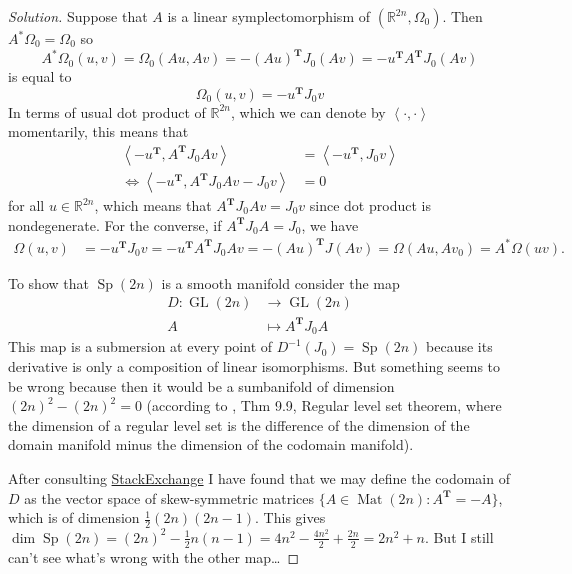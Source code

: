 \begin{proof}[Solution]\leavevmode
	Suppose that $A$ is a linear symplectomorphism of $(\mathbb{R}^{2n},\Omega_0)$. Then $A^{*}\Omega_0=\Omega_0$ so 
	\[A^{*}\Omega_0(u,v) =\Omega_0(Au,Av)=-(Au)^{\mathbf{T}}J_0(Av)=-u^{\mathbf{T}}A^{\mathbf{T}}J_0(Av)\]
is equal to
		\[\Omega_0(u,v)=-u^{\mathbf{T}}J_0v\]
In terms of usual dot product of $\mathbb{R}^{2n}$, which we can denote by $\left<\cdot ,\cdot \right> $ momentarily, this means that
\begin{align*}
	\left<-u^{\mathbf{T}},A^{\mathbf{T}}J_0Av\right> &=\left<-u^{\mathbf{T}},J_0v\right>\\
	\iff\left<-u^{\mathbf{T}},A^{\mathbf{T}}J_0Av-J_0v\right> &=0
\end{align*}
for all $u\in\mathbb{R}^{2n}$, which means that $A^{\mathbf{T}}J_0Av=J_0v$ since dot product is nondegenerate. For the converse, if $A^{\mathbf{T}}J_0A=J_0$, we have
\begin{align*}
	\Omega(u,v)&=-u^{\mathbf{T}}J_0v=-u^{\mathbf{T}}A^{\mathbf{T}}J_0Av=-(Au)^{\mathbf{T}}J(Av)=\Omega(Au,Av_0)=A^*\Omega(uv).
\end{align*}

To show that $\operatorname{Sp}(2n)$ is a smooth manifold consider the map
\begin{align*}
	D: \operatorname{GL}(2n) &\longrightarrow \operatorname{GL}(2n) \\
	A &\longmapsto A^{\mathbf{T}}J_0A
\end{align*}
This map is a submersion at every point of $D^{-1}(J_0)=\operatorname{Sp}(2n)$ because its derivative is only a composition of linear isomorphisms. But something seems to be wrong because then it would be a sumbanifold of dimension $(2n)^2-(2n)^2=0$ (according to \cite{loring}, Thm 9.9, Regular level set theorem, where the dimension of a regular level set is the difference of the dimension of the domain manifold minus the dimension of the codomain manifold).

After consulting \href{https://math.stackexchange.com/questions/4299154/the-symplectic-group-as-a-submanifold-of-mathbbr2n-times-2n}{StackExchange} I have found that we may define the codomain of $D$ as the vector space of skew-symmetric matrices $\{A\in\operatorname{Mat}(2n):A^{\mathbf{T}}=-A\}$, which is of dimension $\frac{1}{2}(2n)(2n-1)$. This gives $\dim \operatorname{Sp}(2n)=(2n)^2-\frac{1}{2}n(n-1)=4n^2-\frac{4n^2}{2}+\frac{2n}{2}=2n^2+n$. {\color{magenta}But I still can't see what's wrong with the other map…}


\end{proof}
